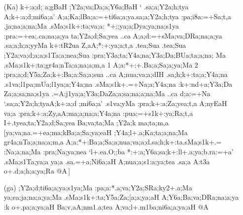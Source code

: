 \begin{spacing}{1.15}
\begin{itemize}
\begin{itemize}
 \item[({\sktf Ka})] {\sktf k+:a;d;%
a;gBaH ;Y2a;va;Da;a;Y6a;BaH} `{\sktf
.sa;a;Y2a;h;tya \ZF{-} A;k+:a;d;mi6a;a}' {\sktf
\ZF{(}A;a;Ka;l\ZF{-}Ba;a:=+ti6a;a;ya\ZF{-}.sa;a;Y2a;h;tya%
\ZF{-}:pa;i8a:=+Sa;t,a\ZF{)} .ja;na;a;na;Ma} {\sktf .sMa;s1k+:ta;va;a:%
*+;;ya;a;Dya;ya;na;s1ya} {\sktf
:pra:=+ea;.ca;na;a;ya\ZF{,} ta;Y2a;d;Sa;yea ..ca
A;a;d:=+sMa;va;DRa;na;a;ya\ZF{,} .sa;a;h;a;yyMa k+:tR2ua Z,aA;*:+:ya;a;t,a  .tea;Sua .tea;Sua
;Y2a;va;d;a;a;s1Ta;a;nea;Sua :pra;Y3a;ta;Y4a;na;Y3a;Da;BUa;ta;a;na;%
Ma .sMa;s1k+:ta;gr4a;nTa;a;na;a;m,a \ZF{(}1\ZF{)}
A;a:*+:+.Ba;a;Sa;a;ya;Ma \ZF{(}2\ZF{)}
:pra;a;d;Y5a;Za;k+:Ba;a}{\sktf :Sa;a;sua} {\sktf ..ca A;nua;va;a;d}{\sktf IH} {\sktf
.sa;h;k+:ta;a;Y4a;na .s1va;l1pa;mUa;l1ya;a;Y4a;na
.sMa;s1k+.=+Na;a;Y4a;na :k+:nd+a;Y3a;Da%
\ZF{-}Za;a;sa;na;s1ya} {\sktf .=A:j1ya;a;Y3a;Da}{\sktf Za;a;sa;na;a;na;Ma} {\sktf ..ca
d;a:=+Na}  `{\sktf .sa;a;Y2a;h;tya\ZF{-}A;k+:a;d%
;mi6a;a}' {\sktf .s1va;yMa :pra;k+:a;Za;yea;t,a A;nyEaH va;a
:pra;k+:a;Zy,aA;ma;a;na;a;Y4a;na :pua:=+s1k+:ya;Ra;t,a\ZF{,}
I+.tyea;ta;Y2a;d;Sa;yea Ba;va;ta;Ma ;Y2a;k ma;ta;m,a}
[{\sktf ya;va;na\ZF{-}.=+ea;ma;k\ZF{-}Ba;a;Sa;ya;eaH
;Y4a;l+.a;Ka;ta;a;na;Ma gr4a;nTa;a;na;a;m,a
{A;a:*+:}Ba;a;Sa;a;nua;va;a;d\ZF{-}.sa;h;k+:ta\ZF{-}.sMa;s1k+.=%
\ZF{-}:Na;a;na;Ma :pra;Na;ya;nea\ZF{,}} `{\sktf l+.ea.O;;ba\ZF{-}{\break}%
*:+:a;Y6a;sa;k+:l\ZF{-}l+.a;ya;b.ra:=+a}'
{\sktf .sMa;s1Ta;ya;a ya;a .sa.=+a;Ni6a;aH A;nua;a;s1:a;ya;tea\ZF{,} .sa;a
A:t3a o+.d;a;h;a;ya;Ra @A}\,]
                      
\item[({\sktf ga})] {\sktf ;Y2a;d;ti6a;a;ya;s1ya;Ma
:pa;a:*.a;va;Y2a;SRa;ky2+.a;Ma ya;ea:ja;na;a;ya;Ma
.sMa;s1k+:ta;Y5a;Za;[a;a;ya;aH
A;Y6a;Ba;va;DRa;na;a;ya :k o+.pa;a;ya;aH Ba;v,aA;nm1.a;tea A;va;l+.m1ba;ni6a;a;ya;aH @A}
 \end{itemize} 
\end{itemize}
\end{spacing}

